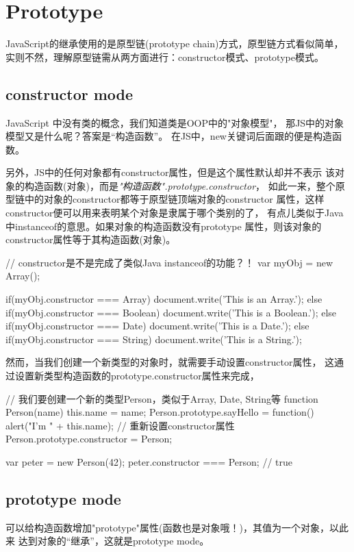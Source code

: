 ﻿\section[Prototype]{Prototype}
JavaScript的继承使用的是原型链(prototype chain)方式，原型链方式看似简单，
实则不然，理解原型链需从两方面进行：constructor模式、prototype模式。

\subsection[constructor mode]{constructor mode}
JavaScript 中没有类的概念，我们知道类是OOP中的"对象模型"，
那JS中的对象模型又是什么呢？答案是“构造函数”。
在JS中，new关键词后面跟的便是构造函数。

另外，JS中的任何对象都有constructor属性，但是这个属性默认却并不表示
该对象的构造函数(对象)，而是\emph{"构造函数".prototype.constructor}，
如此一来，整个原型链中的对象的constructor都等于原型链顶端对象的constructor
属性，这样constructor便可以用来表明某个对象是隶属于哪个类别的了，
有点儿类似于Java中instanceof的意思。如果对象的构造函数没有prototype
属性，则该对象的constructor属性等于其构造函数(对象)。

\begin{javascriptcode}
// constructor是不是完成了类似Java instanceof的功能？！
var myObj = new Array();

if(myObj.constructor === Array) {
  document.write('This is an Array.');
} else if(myObj.constructor === Boolean) {
  document.write('This is a Boolean.');
} else if(myObj.constructor === Date) {
  document.write('This is a Date.');
} else if(myObj.constructor === String) {
  document.write('This is a String.');
}
\end{javascriptcode}

然而，当我们创建一个新类型的对象时，就需要手动设置constructor属性，
这通过设置新类型构造函数的prototype.constructor属性来完成，

\begin{javascriptcode}
// 我们要创建一个新的类型Person，类似于Array, Date, String等
function Person(name) {
  this.name = name;
}
Person.prototype.sayHello = function() {
  alert("I'm " + this.name);
}
// 重新设置constructor属性
Person.prototype.constructor = Person;

var peter = new Person(42);
peter.constructor === Person; // true
\end{javascriptcode}

\subsection[prototype mode]{prototype mode}
可以给构造函数增加"prototype"属性(函数也是对象哦！)，其值为一个对象，以此来
达到对象的“继承”，这就是prototype mode。

